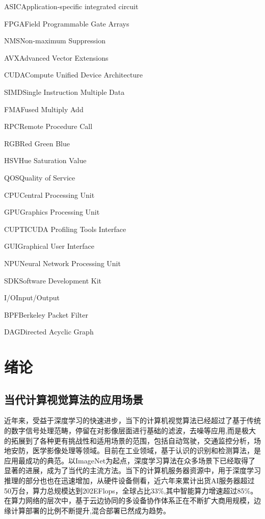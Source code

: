 \documentclass[master]{shtthesis}
\makeatletter
\def\ifgraduate{\ifsht@graduate}
\makeatother
\begin{document}
\ifgraduate
\begin{nomenclatures}[缩写]
  \item{ASIC}{Application-specific integrated circuit}
  \item{FPGA}{Field Programmable Gate Arrays}
  \item{NMS}{Non-maximum Suppression}
  \item{AVX}{Advanced Vector Extensions}
  \item{CUDA}{Compute Unified Device Architecture}
  \item{SIMD}{Single Instruction Multiple Data}
  \item{FMA}{Fused Multiply Add}
  \item{RPC}{Remote Procedure Call}
  \item{RGB}{Red Green Blue}
  \item{HSV}{Hue Saturation Value}
  \item{QOS}{Quality of Service}
  \item{CPU}{Central Processing Unit}
  \item{GPU}{Graphics Processing Unit}
  \item{CUPTI}{CUDA Profiling Tools Interface}
  \item{GUI}{Graphical User Interface}
  \item{NPU}{Neural Network Processing Unit}
  \item{SDK}{Software Development Kit}
  \item{I/O}{Input/Output}
  \item{BPF}{Berkeley Packet Filter}
  \item{DAG}{Directed Acyclic Graph}
\end{nomenclatures}

\fi

\mainmatter
\chapter{绪论}

\section{当代计算视觉算法的应用场景}\label{当代计算视觉算法的应用场景}

近年来，受益于深度学习\cite{lecun2015deep}的快速进步，当下的计算机视觉算法已经超过了基于传统的数字信号处理范畴，停留在对影像层面进行基础的滤波，去噪等应用\cite{dabov2007image},而是极大的拓展到了各种更有挑战性和适用场景的范围，包括自动驾驶\cite{chen2015deepdriving}，交通监控分析\cite{santos2020real}，场地安防\cite{wang2019deep}，医学影像处理\cite{litjens2017survey}等领域。目前在工业领域，基于认识的识别和检测算法，是应用最成功的典范。以ImageNet\cite{deng2009imagenet}为起点，深度学习算法在众多场景下已经取得了显著的进展，成为了当代的主流方法。当下的计算机服务器资源中，用于深度学习推理的部分也也在迅速增加，从硬件设备侧看，近六年来累计出货AI服务器超过50万台，算力总规模达到202EFlops，全球占比33$\%$,其中智能算力增速超过85$\%$\cite{china2022}。在算力网络的层次中，基于云边协同的多设备协作体系正在不断扩大商用规模，边缘计算部署的比例不断提升,混合部署已然成为趋势。
\end{document}
